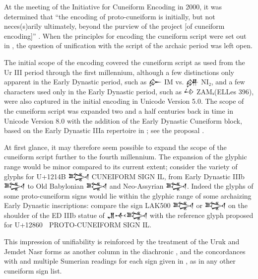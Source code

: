 ﻿At the meeting of the Initiative for Cuneiform Encoding in 2000, it
was determined that “the encoding of proto-cuneiform is initially, but
not neces(s)arily ultimately, beyond the purview of the project
[of cuneiform encoding]” \cite{L2/00-398}. When the principles for encoding
the cuneiform script were set out in \cite{L2/03-162}, the question of
unification with the script of the archaic period was left open.

The initial scope of the encoding covered the cuneiform script as used
from the Ur III period through the first millennium, although a few
distinctions only apparent in the Early Dynastic period, such as
{\oraccnoto 𒅎} IM vs. {\oraccnoto 𒉎} NI₂, and a few characters used
only in the Early Dynastic period, such as {\oraccnoto 𒍡}
ZAMₓ(ELLes \cite{ELLes} 396), were also captured in the initial encoding in
Unicode Version 5.0. The scope of the cuneiform script was expanded
two and a half centuries back in time in Unicode Version 8.0 with the
addition of the Early Dynastic Cuneiform block, based on the Early
Dynastic IIIa repertoire in \cite{LAK}; see the
proposal \cite{L2/12-208}.

At first glance, it may therefore seem possible to expand the scope of
the cuneiform script further to the fourth millennium. The expansion
of the glyphic range would be minor compared to its current extent;
consider the variety of glyphs for U+1214B {\oraccnoto 𒅋} CUNEIFORM
SIGN IL, from Early Dynastic IIIb {\oraccrsp 𒅋} to Old Babylonian
{\oraccobf 𒅋} and Neo-Assyrian {\oraccnao 𒅋}. Indeed the glyphs of
some proto-cuneiform signs would lie within the glyphic range of some
archaizing Early Dynastic inscriptions: compare the sign LAK500
{\oracclak 𒅋} or {\oracclaksaltiii 𒅋} on the shoulder of the ED IIIb
statue of {\oraccnoto 𒂗𒋾𒅋} \cite{P225850} with the reference glyph
proposed for U+12860 {\oraccpc 𒡠} PROTO-CUNEIFORM SIGN IL.

%

This impression of unifiability is reinforced by the treatment of the
Uruk and Jemdet Nasr forms as another column in the
diachronic \cite{LabatMEA}, and the concordances with \cite{LAK} and
multiple Sumerian readings for each sign given
in \cite[167--346]{ATU2}, as in any other cuneiform sign list.

